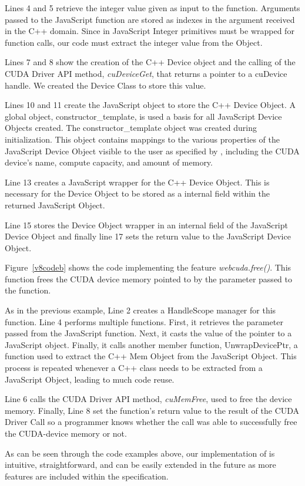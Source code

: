 Lines 4 and 5 retrieve the integer value given as
input to the function. Arguments passed to the JavaScript function are stored
as indexes in the argument received in the C++ domain. Since in JavaScript
Integer primitives must be wrapped for function calls, our code must extract the
integer value from the Object.

Lines 7 and 8 show the creation of the C++ Device object and the calling of the
CUDA Driver API method, \textit{cuDeviceGet}, that returns a pointer to a
cuDevice handle. We created the Device Class to store this value.

Lines 10 and 11 create the JavaScript object to store the C++ Device Object. A
global object, constructor\_template, is used a basis for all JavaScript Device
Objects created. The constructor\_template object was created during
initialization. This object contains mappings to the various properties of the
JavaScript Device Object visible to the user as specified by \namens, including the
CUDA device's name, compute capacity, and amount of memory.

Line 13 creates a JavaScript wrapper for the C++ Device Object. This is
necessary for the Device Object to be stored as a internal field within the
returned JavaScript Object.

Line 15 stores the Device Object wrapper in an internal field of the JavaScript
Device Object and finally line 17 sets the return value to the JavaScript Device
Object.


Figure~\ref{v8codeb} shows the code implementing the \name feature
\textit{webcuda.free()}. This function frees the CUDA device memory pointed to by
the parameter passed to the function. 

As in the previous example, Line 2 creates a HandleScope manager for this
function.  Line 4 performs multiple functions. First, it retrieves the parameter
passed from the JavaScript function. Next, it casts the value of the pointer to
a JavaScript object. Finally, it calls another member function, UnwrapDevicePtr, a
function used to extract the C++ Mem Object from the JavaScript Object. This
process is repeated whenever a C++ class needs to be extracted from a JavaScript
Object, leading to much code reuse.

Line 6 calls the CUDA Driver API method, \textit{cuMemFree}, used to free the
device memory. Finally, Line 8 set the function's return value to the result of
the CUDA Driver Call so a programmer knows whether the call was able to
successfully free the CUDA-device memory or not.


As can be seen through the code examples above, our implementation of \name is intuitive,
straightforward, and can be easily extended in the future as more features are
included within the \name specification.



